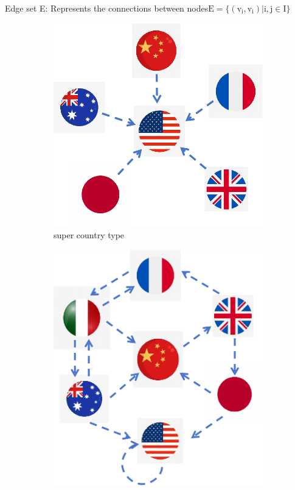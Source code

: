 \documentclass{mcmthesis}
\begin{document}
Edge set E: Represents the connections between nodes$\mathrm{E=\{(v_{i},v_{i})|i,j\in I\}}$

\begin{figure}[H]
    \centering
    \begin{subfigure}{0.45\textwidth}
        \centering
        \includegraphics[width=\textwidth]{graph/graphy super country.png}
        \caption{super country type}
        \label{subfig:player1}
    \end{subfigure}
    \hfill
    \begin{subfigure}{0.45\textwidth}
        \centering
        \includegraphics[width=\textwidth]{graph/graphy country flow.png}

\end{subfigure}
\end{figure}
\end{document}
